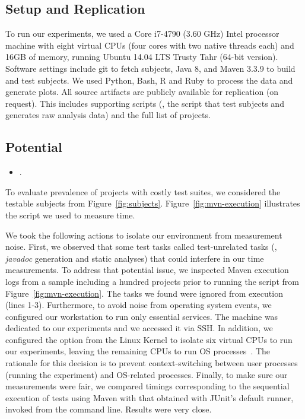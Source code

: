 \subsection{Setup and Replication}
\label{sec:setup}

To run our experiments, we used a Core i7-4790 (3.60 GHz) Intel
processor machine with eight virtual CPUs (four cores with two native
threads each) and 16GB of memory, running Ubuntu 14.04 LTS Trusty Tahr
(64-bit version).  Software settings include git to fetch
subjects, Java 8, and Maven 3.3.9 to build and test subjects. We used
Python, Bash, R and Ruby to process the
data and generate plots.  All source artifacts are publicly available
for replication (on request).  This
includes supporting scripts (\eg, the script that test subjects and
generates raw analysis data) and the full list of projects. 

\subsection{Potential}
\label{sec:rqA}
\label{sec:rqB}

\begin{itemize}
    \item \numRQA{}. \textbf{\RQA}
\end{itemize}

To evaluate prevalence of projects with costly test suites, we
considered the \numSubjs{} testable subjects from
Figure~\ref{fig:subjects}.  Figure~\ref{fig:mvn-execution} illustrates
the script we used to measure time.

We took the following actions to isolate our environment from
measurement noise.  First, we observed that some test tasks called
test-unrelated tasks (\eg, \emph{javadoc} generation and static
analyses) that could interfere in our time measurements.  To address
that potential issue, we inspected Maven execution logs from a sample
including a hundred projects prior to running the script from
Figure~\ref{fig:mvn-execution}.  The tasks we found were ignored from
execution (lines 1-3).  Furthermore, to avoid noise from operating
system events, we configured our workstation to run only essential
services.  The machine was dedicated to our experiments and we
accessed it via SSH. In addition, we configured the 
option from the Linux Kernel \cite{linux-kernel} to isolate six
virtual CPUs to run our experiments, leaving the remaining CPUs to run
OS processes~\cite{isolcpus-use}.  The rationale for this decision is
to prevent context-switching between user processes (running the
experiment) and OS-related processes.  Finally, to make sure our
measurements were fair, we compared timings corresponding to the
sequential execution of tests using Maven with that obtained with
JUnit's default  runner, invoked from the command
line.  Results were very close.

